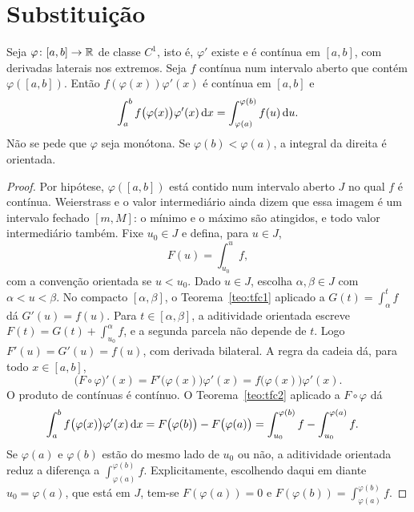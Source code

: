 \documentclass[11pt,a4paper]{article}
\begin{document}

\section{Substituição}

\begin{teorema}[Substituição]\label{teo:substituicao}
Seja $\varphi\colon[a,b]\to\mathbb{R}$ de classe $C^1$, isto é, $\varphi'$ existe e é contínua em $[a,b]$, com derivadas laterais nos extremos. Seja $f$ contínua num intervalo aberto que contém $\varphi([a,b])$. Então $f(\varphi(x))\varphi'(x)$ é contínua em $[a,b]$ e
\begin{equation}
\label{eq:substituicao}
\int_a^b f\bigl(\varphi(x)\bigr)\varphi'(x)\,\mathrm{d} x
=\int_{\varphi(a)}^{\varphi(b)} f(u)\,\mathrm{d} u.
\end{equation}
Não se pede que $\varphi$ seja monótona. Se $\varphi(b)<\varphi(a)$, a integral da direita é orientada.
\end{teorema}

\begin{proof}
Por hipótese, $\varphi([a,b])$ está contido num intervalo aberto $J$ no qual $f$ é contínua. Weierstrass e o valor intermediário ainda dizem que essa imagem é um intervalo fechado $[m,M]$: o mínimo e o máximo são atingidos, e todo valor intermediário também. Fixe $u_0\in J$ e defina, para $u\in J$,
\[
F(u)=\int_{u_0}^u f,
\]
com a convenção orientada se $u<u_0$. Dado $u\in J$, escolha $\alpha,\beta\in J$ com $\alpha<u<\beta$. No compacto $[\alpha,\beta]$, o Teorema~\ref{teo:tfc1} aplicado a $G(t)=\int_\alpha^t f$ dá $G'(u)=f(u)$. Para $t\in[\alpha,\beta]$, a aditividade orientada escreve $F(t)=G(t)+\int_{u_0}^\alpha f$, e a segunda parcela não depende de $t$. Logo $F'(u)=G'(u)=f(u)$, com derivada bilateral. A regra da cadeia dá, para todo $x\in[a,b]$,
\[
\bigl(F\circ\varphi\bigr)'(x)=F'\bigl(\varphi(x)\bigr)\varphi'(x)=f\bigl(\varphi(x)\bigr)\varphi'(x).
\]
O produto de contínuas é contínuo. O Teorema~\ref{teo:tfc2} aplicado a $F\circ\varphi$ dá
\begin{align*}
\int_a^b f\bigl(\varphi(x)\bigr)\varphi'(x)\,\mathrm{d} x
&=F\bigl(\varphi(b)\bigr)-F\bigl(\varphi(a)\bigr)
=\int_{u_0}^{\varphi(b)}f-\int_{u_0}^{\varphi(a)}f.
\end{align*}
Se $\varphi(a)$ e $\varphi(b)$ estão do mesmo lado de $u_0$ ou não, a aditividade orientada reduz a diferença a $\int_{\varphi(a)}^{\varphi(b)}f$. Explicitamente, escolhendo daqui em diante $u_0=\varphi(a)$, que está em $J$, tem-se $F(\varphi(a))=0$ e $F(\varphi(b))=\int_{\varphi(a)}^{\varphi(b)}f$.
\end{proof}
\end{document}

